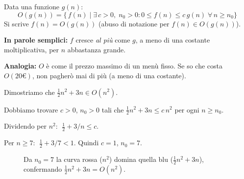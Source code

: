 \begin{definizione}[$O$-grande]
	Data una funzione $g(n)$:
	\[
	O(g(n)) = \bigl\{\,f(n) \mid \exists\,c>0,\;n_0>0 :
	0 \le f(n) \le c\,g(n) \;\forall\,n \ge n_0\bigr\}
	\]
	Si scrive $f(n) = O(g(n))$ (abuso di notazione per
	$f(n) \in O(g(n))$).
\end{definizione}

\begin{nota}
	\textbf{In parole semplici:} $f$ cresce \textit{al più} come $g$,
	a meno di una costante moltiplicativa, per $n$ abbastanza grande.
	
	\textbf{Analogia:} $O$ è come il prezzo massimo di un menù fisso.
	Se so che costa $O(20\text{€})$, non pagherò mai di più (a meno
	di una costante).
\end{nota}

\begin{esempio}
	Dimostriamo che $\tfrac{1}{2}n^2 + 3n \in O(n^2)$.
	
	Dobbiamo trovare $c > 0$, $n_0 > 0$ tali che
	$\tfrac{1}{2}n^2 + 3n \le c\,n^2$ per ogni $n \ge n_0$.
	
	Dividendo per $n^2$: $\;\tfrac{1}{2} + 3/n \le c$.
	
	Per $n \ge 7$: $\;\tfrac{1}{2}+3/7 < 1$. Quindi $c=1$, $n_0=7$. \checkmark
\end{esempio}

\begin{figure}[H]
	\centering
	\caption{Da $n_0=7$ la curva rossa ($n^2$) domina quella blu
		($\tfrac{1}{2}n^2+3n$), confermando
		$\tfrac{1}{2}n^2+3n = O(n^2)$.}
\end{figure}

